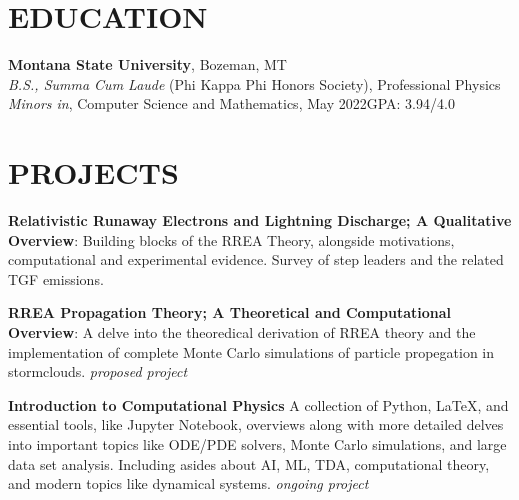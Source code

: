 \documentclass[margin]{res}
\begin{document}
\begin{resume}

\section{EDUCATION}
\textbf{Montana State University}, Bozeman, MT\\
{\sl B.S., Summa Cum Laude} (Phi Kappa Phi Honors Society), Professional Physics \\
{\sl Minors in}, Computer Science and Mathematics, May 2022\hfill GPA: 3.94/4.0\\



\section{PROJECTS}
\par
\textbf{Relativistic Runaway Electrons and Lightning Discharge; A Qualitative Overview}: 
Building blocks of the RREA Theory, alongside motivations, computational and experimental evidence. Survey of step leaders and the related TGF emissions.
\par
\textbf{RREA Propagation Theory; A Theoretical and Computational Overview}:
A delve into the theoredical derivation of RREA theory and the implementation of complete Monte Carlo simulations of particle propegation in stormclouds. \textit{proposed project}
\par 
\textbf{Introduction to Computational Physics}
A collection of Python, \LaTeX , and essential tools, like Jupyter Notebook, overviews along with more detailed delves into important topics like ODE/PDE solvers, Monte Carlo simulations, and large data set analysis. Including asides about AI, ML, TDA, computational theory, and modern topics like dynamical systems. \textit{ongoing project}



\end{resume}
\end{document}
